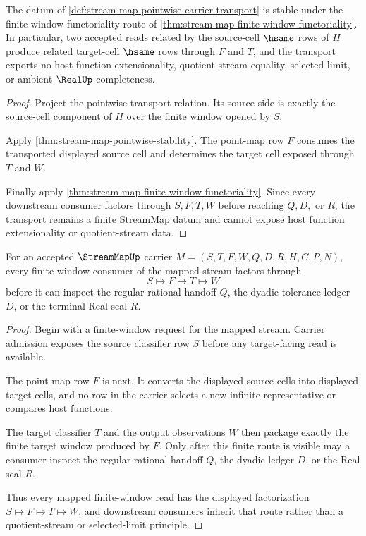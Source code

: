 \begin{theorem}
\label{thm:stream-map-pointwise-carrier-transport-stability}
The datum of \autoref{def:stream-map-pointwise-carrier-transport} is stable under the finite-window functoriality route of \autoref{thm:stream-map-finite-window-functoriality}. In particular, two accepted reads related by the source-cell $\hsame$ rows of $H$ produce related target-cell $\hsame$ rows through $F$ and $T$, and the transport exports no host function extensionality, quotient stream equality, selected limit, or ambient $\RealUp$ completeness.
\end{theorem}
\begin{proof}
Project the pointwise transport relation. Its source side is exactly the source-cell component of $H$ over the finite window opened by $S$.

Apply \autoref{thm:stream-map-pointwise-stability}. The point-map row $F$ consumes the transported displayed source cell and determines the target cell exposed through $T$ and $W$.

Finally apply \autoref{thm:stream-map-finite-window-functoriality}. Since every downstream consumer factors through $S,F,T,W$ before reaching $Q,D,$ or $R$, the transport remains a finite StreamMap datum and cannot expose host function extensionality or quotient-stream data.
\end{proof}

\begin{theorem}
\label{thm:stream-map-finite-window-functoriality}
For an accepted $\StreamMapUp$ carrier $M=(S,T,F,W,Q,D,R,H,C,P,N)$, every finite-window consumer of the mapped stream factors through
$$
S \longmapsto F \longmapsto T \longmapsto W
$$
before it can inspect the regular rational handoff $Q$, the dyadic tolerance ledger $D$, or the terminal Real seal $R$.
\end{theorem}
\begin{proof}
Begin with a finite-window request for the mapped stream. Carrier admission exposes the source classifier row $S$ before any target-facing read is available.

The point-map row $F$ is next. It converts the displayed source cells into displayed target cells, and no row in the carrier selects a new infinite representative or compares host functions.

The target classifier $T$ and the output observations $W$ then package exactly the finite target window produced by $F$. Only after this finite route is visible may a consumer inspect the regular rational handoff $Q$, the dyadic ledger $D$, or the Real seal $R$.

Thus every mapped finite-window read has the displayed factorization $S \longmapsto F \longmapsto T \longmapsto W$, and downstream consumers inherit that route rather than a quotient-stream or selected-limit principle.
\end{proof}

